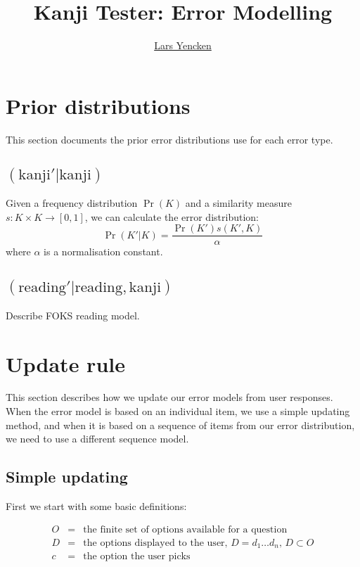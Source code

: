 \documentclass[11pt,a4paper]{article}
\title{\fontspec{ACaslonPro-Bold} Kanji Tester: Error Modelling}
\author{\href{mailto:lljy@csse.unimelb.edu.au}{Lars Yencken}}
\begin{document}
\maketitle

\tableofcontents

\section{Prior distributions}

This section documents the prior error distributions use for each error type. 

\subsection{$(\text{kanji}' | \text{kanji})$}

Given a frequency distribution $\Pr(K)$ and a similarity measure $s: K \times
K \rightarrow [0, 1]$, we can calculate the error distribution:
\[
\Pr(K'|K) = \frac{\Pr(K')s(K', K)}{\alpha}
\]
where $\alpha$ is a normalisation constant.

\subsection{$(\text{reading}' | \text{reading}, \text{kanji})$}

Describe FOKS reading model.

\section{Update rule}

This section describes how we update our error models from user responses.
When the error model is based on an individual item, we use a simple updating
method, and when it is based on a sequence of items from our error
distribution, we need to use a different sequence model.

\subsection{Simple updating}

First we start with some basic definitions:

\begin{eqnarray*}
O & = & \text{the finite set of options available for a question}\\
D & = & \text{the options displayed to the user, $D = d_1 \dots d_n$,
    $D \subset O$}\\
c & = & \text{the option the user picks}\\
\end{eqnarray*}
\end{document}
